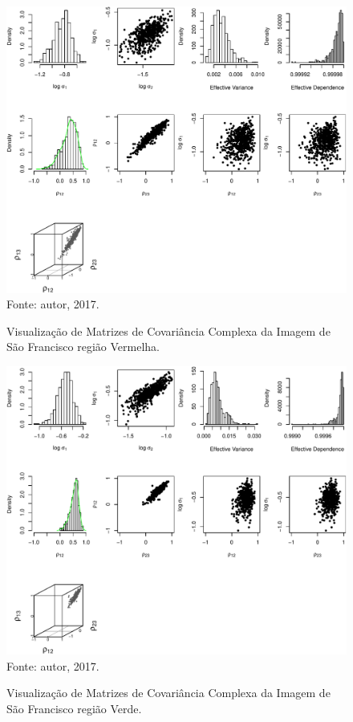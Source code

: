 \documentclass[a4paper,12pt]{article}
\begin{document}
\newpage

\begin{figure}[ht]
\centering
\caption{Visualização de Matrizes de Covariância Complexa da Imagem de São Francisco região Vermelha.}
\includegraphics[width=\linewidth]{../../Figuras/Amostras-SanFrancisc/SanFrancisc-Vermelha-500.pdf}\\
Fonte: autor, 2017.
\label{visSanFrancisc3}
\end{figure}

\newpage

\begin{figure}[ht]
\centering
\caption{Visualização de Matrizes de Covariância Complexa da Imagem de São Francisco região Verde.}
\includegraphics[width=\linewidth]{../../Figuras/Amostras-SanFrancisc/SanFrancisc-Verde-500.pdf}\\
Fonte: autor, 2017.
\label{visSanFrancisc4}
\end{figure}
\end{document}
